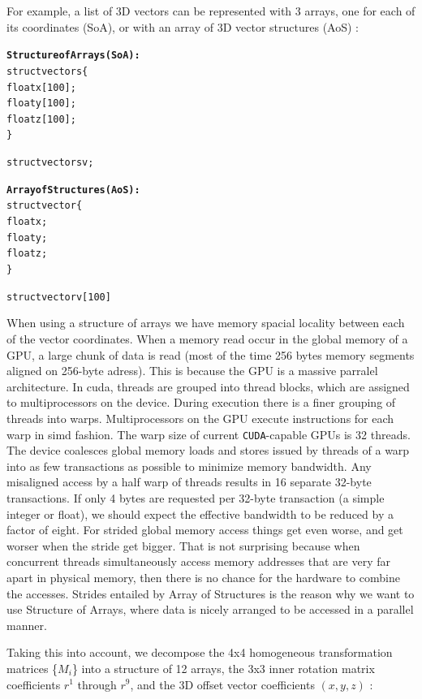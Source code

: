 \documentclass[12pt,journal,compsoc]{IEEEtran}
\begin{document}
For example, a list of 3D vectors can be represented with 3 arrays, one for each of its coordinates (SoA), or with an array of 3D vector structures (AoS) :

\begin{samepage}
\begin{alltt}
\textbf{Structure of Arrays (SoA):}
struct vectors \{
    float x[100];
    float y[100];
    float z[100];
\}

struct vectors v;

\textbf{Array of Structures (AoS):}
struct vector \{
    float x;
    float y;
    float z;
\}

struct vector v[100]
\end{alltt}
\end{samepage}

When using a structure of arrays we have memory spacial locality between each of the vector coordinates. When a memory read occur in the global memory of a GPU, a large chunk of data is read (most of the time 256 bytes memory segments aligned on 256-byte adress). This is because the GPU is a massive parralel architecture.
In \ac{cuda}, threads are grouped into thread blocks, which are assigned to multiprocessors on the device. During execution there is a finer grouping of threads into warps. Multiprocessors on the GPU execute instructions for each warp in \acl{simd} fashion. The warp size of current \texttt{CUDA}-capable GPUs is 32 threads. 
The device coalesces global memory loads and stores issued by threads of a warp into as few transactions as possible to minimize memory bandwidth.
Any misaligned access by a half warp of threads results in 16 separate 32-byte transactions. If only 4 bytes are requested per 32-byte transaction (a simple integer or float), we should expect the effective bandwidth to be reduced by a factor of eight.
For strided global memory access things get even worse, and get worser when the stride get bigger.
That is not surprising because when concurrent threads simultaneously access memory addresses that are very far apart in physical memory, then there is no chance for the hardware to combine the accesses.
Strides entailed by Array of Structures is the reason why we want to use Structure of Arrays, where data is nicely arranged to be accessed in a parallel manner.

Taking this into account, we decompose the 4x4 homogeneous transformation matrices \{$M_i$\} into a structure of 12 arrays, the 3x3 inner rotation matrix coefficients $r^1$ through $r^9$, and the 3D offset vector coefficients $(x,y,z)$ :
\end{document}
